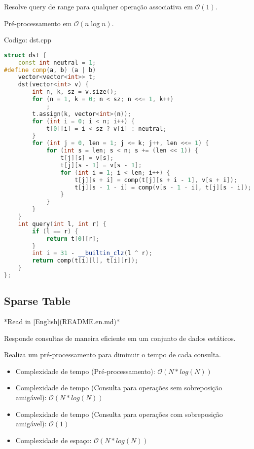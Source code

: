 \documentclass[10pt, a4paper, oneside]{book}
\begin{document}
Resolve query de range para qualquer operação associativa em $\mathcal{O}(1)$.



Pré-processamento em $\mathcal{O}(n \log n)$.

\hfill

Codigo: dst.cpp

\begin{lstlisting}[language=C++]
struct dst {
    const int neutral = 1;
#define comp(a, b) (a | b)
    vector<vector<int>> t;
    dst(vector<int> v) {
        int n, k, sz = v.size();
        for (n = 1, k = 0; n < sz; n <<= 1, k++)
            ;
        t.assign(k, vector<int>(n));
        for (int i = 0; i < n; i++) {
            t[0][i] = i < sz ? v[i] : neutral;
        }
        for (int j = 0, len = 1; j <= k; j++, len <<= 1) {
            for (int s = len; s < n; s += (len << 1)) {
                t[j][s] = v[s];
                t[j][s - 1] = v[s - 1];
                for (int i = 1; i < len; i++) {
                    t[j][s + i] = comp(t[j][s + i - 1], v[s + i]);
                    t[j][s - 1 - i] = comp(v[s - 1 - i], t[j][s - i]);
                }
            }
        }
    }
    int query(int l, int r) {
        if (l == r) {
            return t[0][r];
        }
        int i = 31 - __builtin_clz(l ^ r);
        return comp(t[i][l], t[i][r]);
    }
};
\end{lstlisting}
\hfill

\subsection{Sparse Table}


*Read in [English](README.en.md)*



Responde consultas de maneira eficiente em um conjunto de dados estáticos.\

Realiza um pré-processamento para diminuir o tempo de cada consulta.



\begin{itemize}
\item Complexidade de tempo (Pré-processamento): $\mathcal{O}(N * log(N))$
\item Complexidade de tempo (Consulta para operações sem sobreposição amigável): $\mathcal{O}(N * log(N))$
\item Complexidade de tempo (Consulta para operações com sobreposição amigável): $\mathcal{O}(1)$
\item Complexidade de espaço: $\mathcal{O}(N * log(N))$
\end{itemize}
\end{document}
